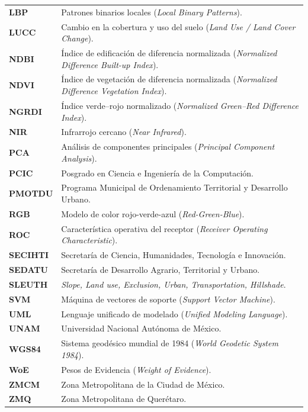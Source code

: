 \begin{longtable}{>{\bfseries}p{} p{}}
LBP & Patrones binarios locales (\textit{Local Binary Patterns}). \\[2pt]
LUCC & Cambio en la cobertura y uso del suelo (\textit{Land Use / Land Cover Change}). \\[2pt]
NDBI & Índice de edificación de diferencia normalizada (\textit{Normalized Difference Built-up Index}). \\[2pt]
NDVI & Índice de vegetación de diferencia normalizada (\textit{Normalized Difference Vegetation Index}). \\[2pt]
NGRDI & Índice verde--rojo normalizado (\textit{Normalized Green--Red Difference Index}). \\[2pt]
NIR & Infrarrojo cercano (\textit{Near Infrared}). \\[2pt]
PCA & Análisis de componentes principales (\textit{Principal Component Analysis}). \\[2pt]
PCIC & Posgrado en Ciencia e Ingeniería de la Computación. \\[2pt]
PMOTDU & Programa Municipal de Ordenamiento Territorial y Desarrollo Urbano. \\[2pt]
RGB & Modelo de color rojo-verde-azul (\textit{Red-Green-Blue}). \\[2pt]
ROC & Característica operativa del receptor (\textit{Receiver Operating Characteristic}). \\[2pt]
SECIHTI & Secretaría de Ciencia, Humanidades, Tecnología e Innovación. \\[2pt]
SEDATU & Secretaría de Desarrollo Agrario, Territorial y Urbano. \\[2pt]
SLEUTH & \textit{Slope, Land use, Exclusion, Urban, Transportation, Hillshade}. \\[2pt]
SVM & Máquina de vectores de soporte (\textit{Support Vector Machine}). \\[2pt]
UML & Lenguaje unificado de modelado (\textit{Unified Modeling Language}). \\[2pt]
UNAM & Universidad Nacional Autónoma de México. \\[2pt]
WGS84 & Sistema geodésico mundial de 1984 (\textit{World Geodetic System 1984}). \\[2pt]
WoE & Pesos de Evidencia (\textit{Weight of Evidence}). \\[2pt]
ZMCM & Zona Metropolitana de la Ciudad de México. \\[2pt]
ZMQ & Zona Metropolitana de Querétaro. \\
\end{longtable}
\cleardoublepage
